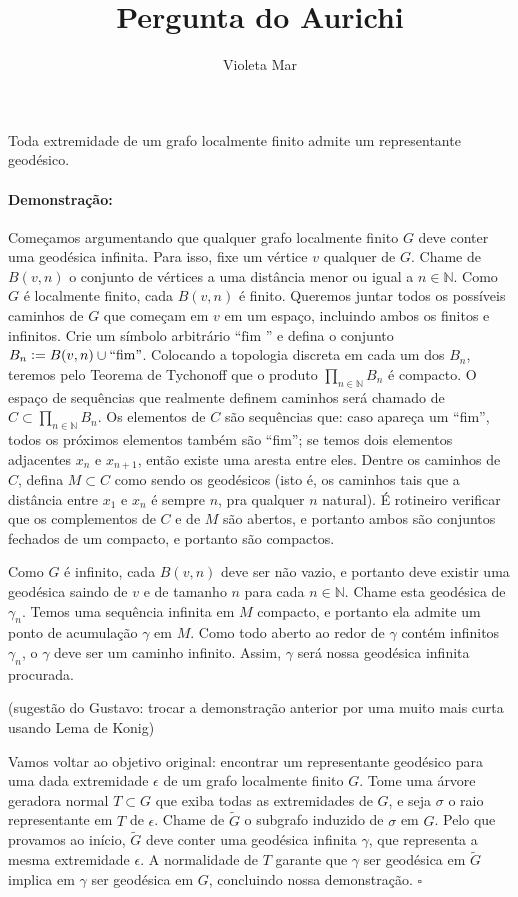 \documentclass[11pt]{article}
\title{Pergunta do Aurichi}
\author{Violeta Mar}
\date{}
\newcommand{\defeq}{\vcentcolon=}
\newcommand{\pulinho}{\vspace{.5cm}}
\theoremstyle{definition}
\theoremstyle{definition}
\theoremstyle{definition}
\theoremstyle{definition}
\newtheorem*{prop*}{Proposição}
\newenvironment{proposicao*}{
\definecolor{shadecolor}{HTML}{FFDBDF}
\begin{shaded}
\begin{prop*}
}
{
\end{prop*}
\end{shaded}
}
\theoremstyle{definition}
\theoremstyle{definition}
\theoremstyle{definition}
\theoremstyle{definition}
\theoremstyle{definition}
\theoremstyle{definition}
\theoremstyle{definition}
\theoremstyle{definition}
\newenvironment{prova}{\paragraph{Demonstração:}}{\hfill$\square$ 
\pulinho
}
\theoremstyle{definition}
\begin{document}
\maketitle

\begin{proposicao*}
Toda extremidade de um grafo localmente finito admite um representante geodésico.
\end{proposicao*}

\begin{prova}
  Começamos argumentando que qualquer grafo localmente finito $G$ deve conter uma geodésica infinita. Para isso, fixe um vértice $v$ qualquer de $G$. Chame de $B(v,n)$ o conjunto de vértices a uma distância menor ou igual a $n \in \mathbb{N}$. Como $G$ é localmente finito, cada $B(v,n)$ é finito. Queremos juntar todos os possíveis caminhos de $G$ que começam em $v$ em um espaço, incluindo ambos os finitos e infinitos. Crie um símbolo arbitrário $\text{``fim ''}$ e defina o conjunto $B_n \defeq B(v,n) \cup \text{``fim''}$. Colocando a topologia discreta em cada um dos $B_n$, teremos pelo Teorema de Tychonoff que o produto $\prod_{n \in \mathbb{N}}^{} B_n$ é compacto. O espaço de sequências que realmente definem caminhos será chamado de $C \subset \prod_{n \in \mathbb{N}}^{} B_n$. Os elementos de $C$ são sequências que: caso apareça um ``fim'', todos os próximos elementos também são ``fim''; se temos dois elementos adjacentes $x_n$ e $x_{n+1}$, então existe uma aresta entre eles. Dentre os caminhos de $C$, defina $M \subset C$ como sendo os geodésicos (isto é, os caminhos tais que a distância entre $x_1$ e $x_n$ é sempre $n$, pra qualquer $n$ natural). É rotineiro verificar que os complementos de $C$ e de $M$ são abertos, e portanto ambos são conjuntos fechados de um compacto, e portanto são compactos.
  
  Como $G$ é infinito, cada $B(v,n)$ deve ser não vazio, e portanto deve existir uma geodésica saindo de $v$ e de tamanho $n$ para cada $n \in \mathbb{N}$. Chame esta geodésica de $\gamma_n$. Temos uma sequência infinita em $M$ compacto, e portanto ela admite um ponto de acumulação $\gamma$ em $M$. Como todo aberto ao redor de $\gamma$ contém infinitos $\gamma_n$, o $\gamma$ deve ser um caminho infinito. Assim, $\gamma$ será nossa geodésica infinita procurada.

  (sugestão do Gustavo: trocar a demonstração anterior por uma muito mais curta usando Lema de Konig)

  Vamos voltar ao objetivo original: encontrar um representante geodésico para uma dada extremidade $\epsilon$ de um grafo localmente finito $G$. Tome uma árvore geradora normal $T \subset G$ que exiba todas as extremidades de $G$, e seja $\sigma$ o raio representante em $T$ de $\epsilon$. Chame de $\tilde{G}$ o subgrafo induzido de $\sigma$ em $G$. Pelo que provamos ao início, $\tilde{G}$ deve conter uma geodésica infinita $\gamma$, que representa a mesma extremidade $\epsilon$. A normalidade de $T$ garante que $\gamma$ ser geodésica em $\tilde{G}$ implica em $\gamma$ ser geodésica em $G$, concluindo nossa demonstração.
\end{prova}
\end{document}
